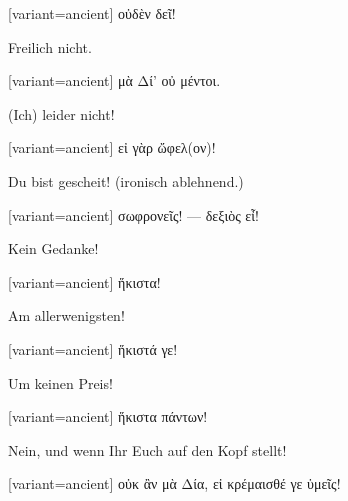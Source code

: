 \switchcolumn

\begin{greek}[variant=ancient]%
οὐδὲν δεῖ!

\end{greek}%
\switchcolumn*

Freilich nicht. 

\switchcolumn

\begin{greek}[variant=ancient]%
μὰ Δί' οὐ μέντοι.

\end{greek}%
\switchcolumn*

(Ich) leider nicht! 

\switchcolumn

\begin{greek}[variant=ancient]%
εἰ γὰρ ὤφελ(ον)!

\end{greek}%
\switchcolumn*

Du bist gescheit! (ironisch ablehnend.) 

\switchcolumn

\begin{greek}[variant=ancient]%
σωφρονεῖς! --- δεξιὸς εἶ!

\end{greek}%
\switchcolumn*

Kein Gedanke! 

\switchcolumn

\begin{greek}[variant=ancient]%
ἥκιστα!

\end{greek}%
\switchcolumn*

Am allerwenigsten! 

\switchcolumn

\begin{greek}[variant=ancient]%
ἥκιστά γε!

\end{greek}%
\switchcolumn*

Um keinen Preis! 

\switchcolumn

\begin{greek}[variant=ancient]%
ἥκιστα πάντων!

\end{greek}%
\switchcolumn*

Nein, und wenn Ihr Euch auf den Kopf stellt! 

\switchcolumn

\begin{greek}[variant=ancient]%
οὐκ ἂν μὰ Δία, εἰ κρέμαισθέ γε ὑμεῖς!

\end{greek}%
\switchcolumn*

